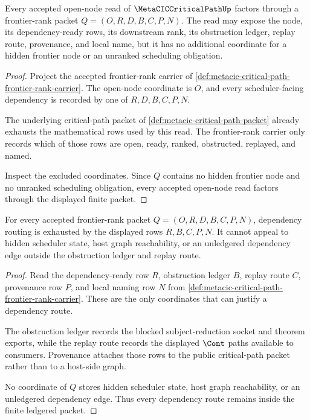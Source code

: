 \begin{theorem}
\label{thm:metacic-critical-path-open-node-exhaustion}
Every accepted open-node read of $\MetaCICCriticalPathUp$ factors through a frontier-rank packet $Q=(O,R,D,B,C,P,N)$. The read may expose the node, its dependency-ready rows, its downstream rank, its obstruction ledger, replay route, provenance, and local name, but it has no additional coordinate for a hidden frontier node or an unranked scheduling obligation.
\end{theorem}
\begin{proof}
Project the accepted frontier-rank carrier of \autoref{def:metacic-critical-path-frontier-rank-carrier}. The open-node coordinate is $O$, and every scheduler-facing dependency is recorded by one of $R,D,B,C,P,N$.

The underlying critical-path packet of \autoref{def:metacic-critical-path-packet} already exhausts the mathematical rows used by this read. The frontier-rank carrier only records which of those rows are open, ready, ranked, obstructed, replayed, and named.

Inspect the excluded coordinates. Since $Q$ contains no hidden frontier node and no unranked scheduling obligation, every accepted open-node read factors through the displayed finite packet.
\end{proof}

\begin{theorem}
\label{thm:metacic-critical-path-dependency-route-nonescape}
For every accepted frontier-rank packet $Q=(O,R,D,B,C,P,N)$, dependency routing is exhausted by the displayed rows $R,B,C,P,N$. It cannot appeal to hidden scheduler state, host graph reachability, or an unledgered dependency edge outside the obstruction ledger and replay route.
\end{theorem}
\begin{proof}
Read the dependency-ready row $R$, obstruction ledger $B$, replay route $C$, provenance row $P$, and local naming row $N$ from \autoref{def:metacic-critical-path-frontier-rank-carrier}. These are the only coordinates that can justify a dependency route.

The obstruction ledger records the blocked subject-reduction socket and theorem exports, while the replay route records the displayed $\Cont$ paths available to consumers. Provenance attaches those rows to the public critical-path packet rather than to a host-side graph.

No coordinate of $Q$ stores hidden scheduler state, host graph reachability, or an unledgered dependency edge. Thus every dependency route remains inside the finite ledgered packet.
\end{proof}

